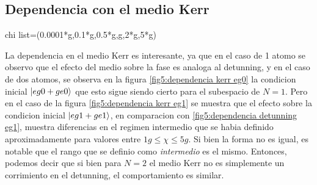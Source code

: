 \subsection{Dependencia con el medio Kerr}
chi list=(0.0001*g,0.1*g,0.5*g,g,2*g,5*g)

La dependencia en el medio Kerr es interesante, ya que en el caso de 1 atomo se observo que el efecto del medio sobre la fase es analoga al detunning, y en el caso de dos atomos, se observa en la figura \ref{fig5:dependencia kerr eg0} la condicion inicial $\ket{eg0+ge0}$ que esto sigue siendo cierto para el subespacio de $N=1$. Pero en el caso de la figura \ref{fig5:dependencia kerr eg1} se muestra que el efecto sobre la condicion inicial $\ket{eg1+ge1}$, en comparacion con \ref{fig5:dependencia detunning eg1}, muestra diferencias en el regimen intermedio que se habia definido aproximadamente para valores entre $1g \leq \chi \leq 5g$. Si bien la forma no es igual, es notable que el rango que se definio como \textit{intermedio} es el mismo. Entonces, podemos decir que si bien para $N=2$ el medio Kerr no es simplemente un corrimiento en el detunning, el comportamiento es similar. 

